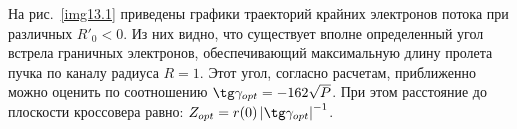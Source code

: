 На рис.~\ref{img13.1} приведены графики траекторий крайних электронов потока 
при различных \( R'_0 < 0 \). Из них видно, что существует вполне определенный 
угол встрела граничных электронов, обеспечивающий максимальную длину пролета 
пучка по каналу радиуса \( R = 1 \). Этот угол, согласно расчетам, 
приближенно можно оценить по соотношению \( \tg\gamma_{opt} = -162\sqrt{P} \). 
При этом расстояние до плоскости кроссовера равно:
\( Z_{opt} = r(0)\left| \tg\gamma_{opt} \right|^{-1} \).
